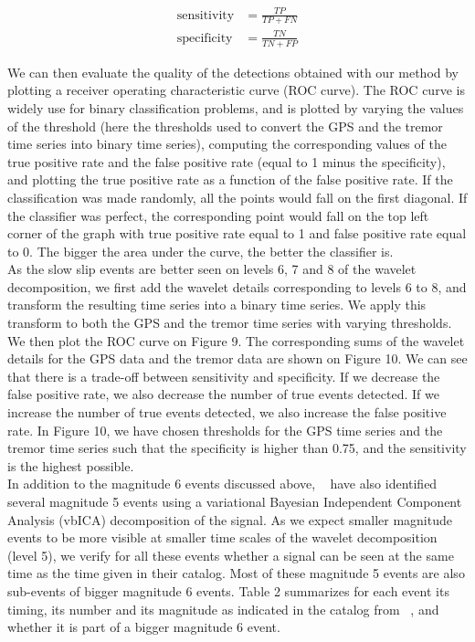 \documentclass{article}
\begin{document}
\begin{equation}
\begin{aligned}
\text{sensitivity} &= \frac{TP}{TP + FN} \\
\text{specificity} &= \frac{TN} {TN + FP}
\end{aligned}
\end{equation}

We can then evaluate the quality of the detections obtained with our method by plotting a receiver operating characteristic curve (ROC curve). The ROC curve is widely use for binary classification problems, and is plotted by varying the values of the threshold (here the thresholds used to convert the GPS and the tremor time series into binary time series), computing the corresponding values of the true positive rate and the false positive rate (equal to 1 minus the specificity), and plotting the true positive rate as a function of the false positive rate. If the classification was made randomly, all the points would fall on the first diagonal. If the classifier was perfect, the corresponding point would fall on the top left corner of the graph with true positive rate equal to 1 and false positive rate equal to 0. The bigger the area under the curve, the better the classifier is. \\

As the slow slip events are better seen on levels 6, 7 and 8 of the wavelet decomposition, we first add the wavelet details corresponding to levels 6 to 8, and transform the resulting time series into a binary time series. We apply this transform to both the GPS and the tremor time series with varying thresholds. We then plot the ROC curve on Figure 9. The corresponding sums of the wavelet details for the GPS data and the tremor data are shown on Figure 10. We can see that there is a trade-off between sensitivity and specificity. If we decrease the false positive rate, we also decrease the number of true events detected. If we increase the number of true events detected, we also increase the false positive rate. In Figure 10, we have chosen thresholds for the GPS time series and the tremor time series such that the specificity is higher than 0.75, and the sensitivity is the highest possible. \\

In addition to the magnitude 6 events discussed above,  ~\citet{MIC_2019} have also identified several magnitude 5 events using a variational Bayesian Independent Component Analysis (vbICA) decomposition of the signal. As we expect smaller magnitude events to be more visible at smaller time scales of the wavelet decomposition (level 5), we verify for all these events whether a signal can be seen at the same time as the time given in their catalog. Most of these magnitude 5 events are also sub-events of bigger magnitude 6 events. Table 2 summarizes for each event its timing, its number and its magnitude as indicated in the catalog from ~\citet{MIC_2019}, and whether it is part of a bigger magnitude 6 event. \\ 
\end{document}
